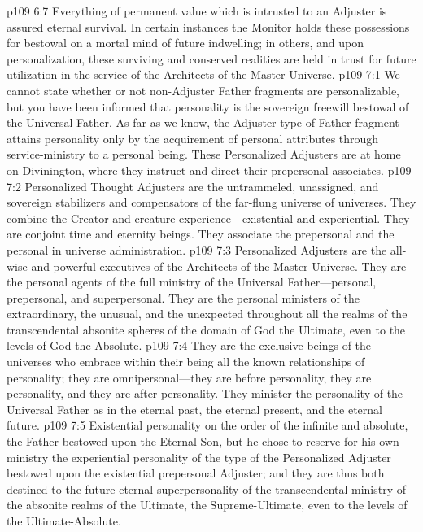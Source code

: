 \vs p109 6:7 Everything of permanent value which is intrusted to an Adjuster is assured eternal survival. In certain instances the Monitor holds these possessions for bestowal on a mortal mind of future indwelling; in others, and upon personalization, these surviving and conserved realities are held in trust for future utilization in the service of the Architects of the Master Universe.
\vs p109 7:1 We cannot state whether or not non\hyp{}Adjuster Father fragments are personalizable, but you have been informed that personality is the sovereign freewill bestowal of the Universal Father. As far as we know, the Adjuster type of Father fragment attains personality only by the acquirement of personal attributes through service\hyp{}ministry to a personal being. These Personalized Adjusters are at home on Divinington, where they instruct and direct their prepersonal associates.\plusone
\vs p109 7:2 Personalized Thought Adjusters are the untrammeled, unassigned, and sovereign stabilizers and compensators of the far\hyp{}flung universe of universes. They combine the Creator and creature experience---existential and experiential. They are conjoint time and eternity beings. They associate the prepersonal and the personal in universe administration.
\vs p109 7:3 Personalized Adjusters are the all\hyp{}wise and powerful executives of the Architects of the Master Universe. They are the personal agents of the full ministry of the Universal Father---personal, prepersonal, and superpersonal. They are the personal ministers of the extraordinary, the unusual, and the unexpected throughout all the realms of the transcendental absonite spheres of the domain of God the Ultimate, even to the levels of God the Absolute.
\vs p109 7:4 They are the exclusive beings of the universes who embrace within their being all the known relationships of personality; they are omnipersonal---they are before personality, they are personality, and they are after personality. They minister the personality of the Universal Father as in the eternal past, the eternal present, and the eternal future.
\vs p109 7:5 Existential personality on the order of the infinite and absolute, the Father bestowed upon the Eternal Son, but he chose to reserve for his own ministry the experiential personality of the type of the Personalized Adjuster bestowed upon the existential prepersonal Adjuster; and they are thus both destined to the future eternal superpersonality of the transcendental ministry of the absonite realms of the Ultimate, the Supreme\hyp{}Ultimate, even to the levels of the Ultimate\hyp{}Absolute.
